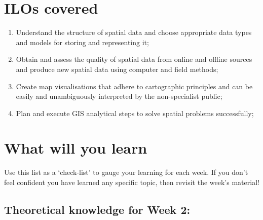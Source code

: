 \documentclass[
  letterpaper,
  DIV=11,
  numbers=noendperiod]{scrreprt}
\begin{document}
\section*{ILOs covered}\label{ilos-covered-1}


\begin{enumerate}
\def\labelenumi{\arabic{enumi}.}
\item
  Understand the structure of spatial data and choose appropriate data
  types and models for storing and representing it;
\item
  Obtain and assess the quality of spatial data from online and offline
  sources and produce new spatial data using computer and field methods;
\item
  Create map visualisations that adhere to cartographic principles and
  can be easily and unambiguously interpreted by the non-specialist
  public;
\item
  Plan and execute GIS analytical steps to solve spatial problems
  successfully;
\end{enumerate}

\section*{What will you learn}\label{what-will-you-learn-1}


Use this list as a `check-list' to gauge your learning for each week. If
you don't feel confident you have learned any specific topic, then
revisit the week's material!

\subsection*{Theoretical knowledge for Week
2:}\label{theoretical-knowledge-for-week-2}
\end{document}
